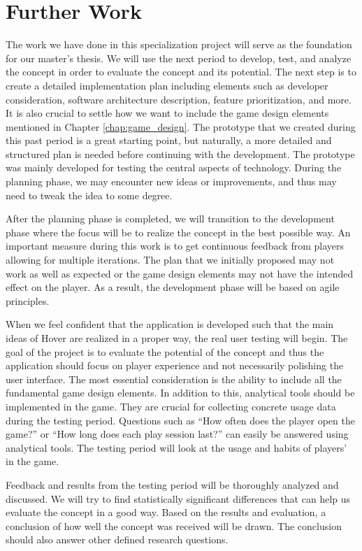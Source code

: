 \documentclass[../Main.tex]{subfiles}
\begin{document}
\section{Further Work}
\label{chap:further_work}

The work we have done in this specialization project will serve as the foundation for our master’s thesis. We will use the next period to develop, test, and analyze the concept in order to evaluate the concept and its potential. The next step is to create a detailed implementation plan including elements such as developer consideration, software architecture description, feature prioritization, and more. It is also crucial to settle how we want to include the game design elements mentioned in Chapter \ref{chap:game_design}. The prototype that we created during this past period is a great starting point, but naturally, a more detailed and structured plan is needed before continuing with the development. The prototype was mainly developed for testing the central aspects of technology. During the planning phase, we may encounter new ideas or improvements, and thus may need to tweak the idea to some degree.

After the planning phase is completed, we will transition to the development phase where the focus will be to realize the concept in the best possible way. An important measure during this work is to get continuous feedback from players allowing for multiple iterations. The plan that we initially proposed may not work as well as expected or the game design elements may not have the intended effect on the player. As a result, the development phase will be based on agile principles.

When we feel confident that the application is developed such that the main ideas of Hover are realized in a proper way, the real user testing will begin. The goal of the project is to evaluate the potential of the concept and thus the application should focus on player experience and not necessarily polishing the user interface. The most essential consideration is the ability to include all the fundamental game design elements. In addition to this, analytical tools should be implemented in the game. They are crucial for collecting concrete usage data during the testing period. Questions such as “How often does the player open the game?” or “How long does each play session last?” can easily be answered using analytical tools. The testing period will look at the usage and habits of players’ in the game.

Feedback and results from the testing period will be thoroughly analyzed and discussed. We will try to find statistically significant differences that can help us evaluate the concept in a good way. Based on the results and evaluation, a conclusion of how well the concept was received will be drawn. The conclusion should also answer other defined research questions.

\biblio %
\end{document}
